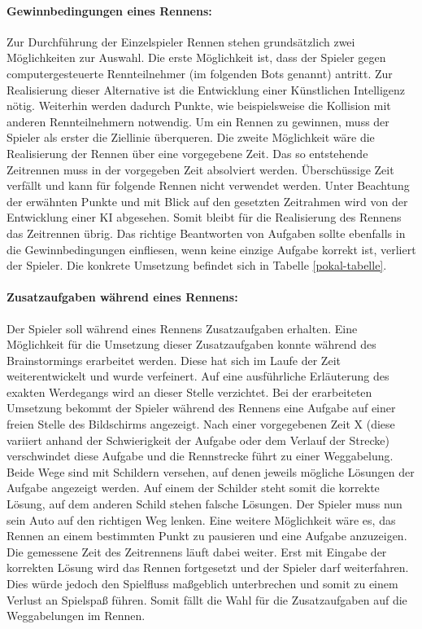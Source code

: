		\paragraph{Gewinnbedingungen eines Rennens:}\label{gewinnbedinungen}
		Zur Durchführung der Einzelspieler Rennen stehen grundsätzlich zwei Möglichkeiten zur Auswahl. Die erste Möglichkeit ist, dass der Spieler gegen computergesteuerte Rennteilnehmer (im folgenden Bots genannt) antritt. Zur Realisierung dieser Alternative ist die Entwicklung einer Künstlichen Intelligenz nötig. Weiterhin werden dadurch Punkte, wie beispielsweise die Kollision mit anderen Rennteilnehmern notwendig. Um ein Rennen zu gewinnen, muss der Spieler als erster die Ziellinie überqueren.
		Die zweite Möglichkeit wäre die Realisierung der Rennen über eine vorgegebene Zeit. Das so entstehende Zeitrennen muss in der vorgegeben Zeit absolviert werden. Überschüssige Zeit verfällt und kann für folgende Rennen nicht verwendet werden.
		Unter Beachtung der erwähnten Punkte und mit Blick auf den gesetzten Zeitrahmen wird von der Entwicklung einer KI abgesehen. Somit bleibt für die Realisierung des Rennens das Zeitrennen übrig.
		Das richtige Beantworten von Aufgaben sollte ebenfalls in die Gewinnbedingungen einfliesen, wenn keine einzige Aufgabe korrekt ist, verliert der Spieler. Die konkrete Umsetzung befindet sich in Tabelle \ref{pokal-tabelle}.

		\paragraph{Zusatzaufgaben während eines Rennens:}\label{par:aufgaben}
		Der Spieler soll während eines Rennens Zusatzaufgaben erhalten. Eine Möglichkeit für die Umsetzung dieser Zusatzaufgaben konnte während des Brainstormings erarbeitet werden. Diese hat sich im Laufe der Zeit weiterentwickelt und wurde verfeinert. Auf eine ausführliche Erläuterung des exakten Werdegangs wird an dieser Stelle verzichtet.
		Bei der erarbeiteten Umsetzung bekommt der Spieler während des Rennens eine Aufgabe auf einer freien Stelle des Bildschirms angezeigt. Nach einer vorgegebenen Zeit X (diese variiert anhand der Schwierigkeit der Aufgabe oder dem Verlauf der Strecke) verschwindet diese Aufgabe und die Rennstrecke führt zu einer Weggabelung. Beide Wege sind mit Schildern versehen, auf denen jeweils mögliche Lösungen der Aufgabe angezeigt werden. Auf einem der Schilder steht somit die korrekte Lösung, auf dem anderen Schild stehen falsche Lösungen. Der Spieler muss nun sein Auto auf den richtigen Weg lenken.
		Eine weitere Möglichkeit wäre es, das Rennen an einem bestimmten Punkt zu pausieren und eine Aufgabe anzuzeigen. Die gemessene Zeit des Zeitrennens läuft dabei weiter. Erst mit Eingabe der korrekten Lösung wird das Rennen fortgesetzt und der Spieler darf weiterfahren. Dies würde jedoch den Spielfluss maßgeblich unterbrechen und somit zu einem Verlust an Spielspaß führen. Somit fällt die Wahl für die Zusatzaufgaben auf die Weggabelungen im Rennen.

